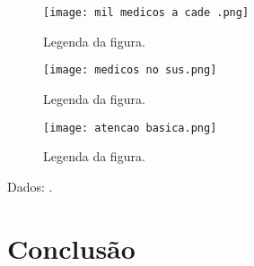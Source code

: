 \documentclass[twoside]{article}
\begin{document}
\begin{multicols}{2}
  \fi
  \begin{figure}[H]
    \centering
    \texttt{[image: mil medicos a cade .png]}
    \caption{Legenda da figura.}
    \label{fig2}
  \end{figure}

  \begin{figure}[H]
    \centering
    \texttt{[image: medicos no sus.png]}
    \caption{Legenda da figura.}
    \label{fig2}
  \end{figure}

  \begin{figure}[H]
    \centering
    \texttt{[image: atencao basica.png]}
    \caption{Legenda da figura.}
    \label{fig2}
  \end{figure}

  Dados: \cite{Viacava_2018}.





  \section{Conclusão}







\end{multicols}
\end{document}
